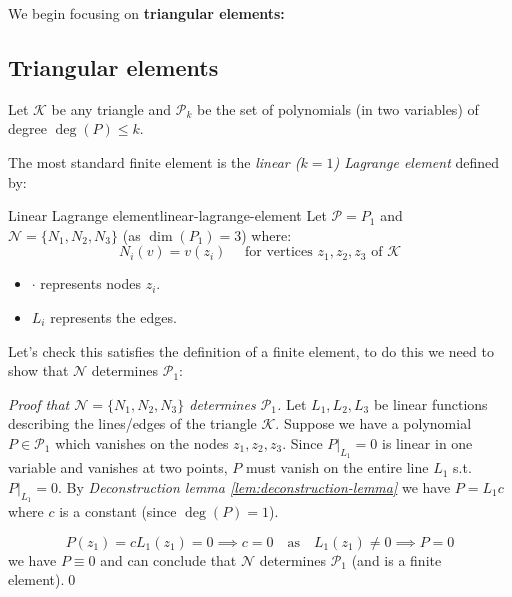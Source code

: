 We begin focusing on \textbf{triangular elements:}

\subsection{Triangular elements}
Let $\mathcal{K}$ be any triangle and $\mathcal{P}_k$ be the set of polynomials (in two variables) of degree $\deg(P) \leq k$.

The most standard finite element is the \emph{linear ($k=1$) Lagrange element} defined by:

\begin{definition}{Linear Lagrange element}{linear-lagrange-element}
    Let $\mathcal{P} = P_1$ and $\mathcal{N} = \{N_1, N_2, N_3\}$ (as $\dim(P_1) = 3$) where:
    \[
        N_i(v) = v(z_i) \quad \text{ for vertices } z_1, z_2, z_3 \text{ of } \mathcal{K}
    \]
\end{definition}
\begin{center}
\end{center}
\begin{itemize}
    \item $\cdot$ represents nodes $z_i$.
    \item $L_i$ represents the edges.
\end{itemize}

Let's check this satisfies the definition of a finite element, to do this we need to show that $\mathcal{N}$ determines $\mathcal{P}_1$:
\begin{proof}[Proof that $\mathcal{N}=\{N_1, N_2, N_3\}$ determines $\mathcal{P}_1$]

    \medskip

    Let $L_1, L_2, L_3$ be linear functions describing the lines/edges of the triangle $\mathcal{K}$.
    \medskip
    Suppose we have a polynomial $P \in \mathcal{P}_1$ which vanishes on the nodes $z_1, z_2, z_3$.
    \medskip
    Since $P|_{L_1} = 0$ is linear in one variable and vanishes at two points, $P$ must vanish on the entire line $L_1$ s.t. $P|_{L_1} = 0$.
    By \emph{Deconstruction lemma \ref{lem:deconstruction-lemma}} we have $P = L_1 c$ where $c$ is a constant (since $\deg(P) = 1$).

    \[
        P(z_1) = c L_1(z_1) = 0 \implies c = 0 \quad \text{as} \quad L_1(z_1) \neq 0 \implies P = 0
    \]
    we have $P \equiv 0$ and can conclude that $\mathcal{N}$ determines $\mathcal{P}_1$ (and is a finite element).\qed
\end{proof}

